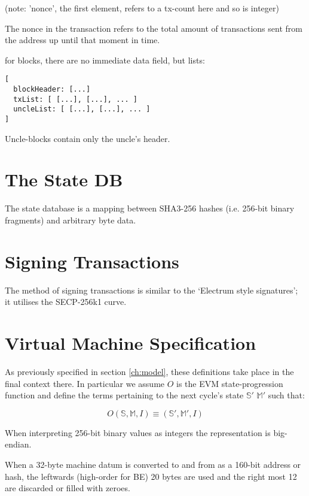 \documentclass[9pt,oneside]{amsart}
\begin{document}
(note: 'nonce', the first element, refers to a tx-count here and so is integer)

The nonce in the transaction refers to the total amount of transactions sent from the address up until that moment in time.

for blocks, there are no immediate data field, but lists:

\begin{verbatim}
[
  blockHeader: [...]
  txList: [ [...], [...], ... ]
  uncleList: [ [...], [...], ... ]
]
\end{verbatim}

Uncle-blocks contain only the uncle's header.

\section{The State DB}\label{app:state}

The state database is a mapping between SHA3-256 hashes (i.e. 256-bit binary fragments) and arbitrary byte data.

\section{Signing Transactions}\label{app:signing}

The method of signing transactions is similar to the `Electrum style signatures'; it utilises the SECP-256k1 curve.

\section{Virtual Machine Specification}\label{app:vm}

As previously specified in section \ref{ch:model}, these definitions take place in the final context there. In particular we assume $O$ is the EVM state-progression function and define the terms pertaining to the next cycle's state $\mathbb{S}'$ $\mathbb{M}'$ such that:

\begin{equation}
O(\mathbb{S}, \mathbb{M}, I) \equiv (\mathbb{S}', \mathbb{M}', I)
\end{equation}

When interpreting 256-bit binary values as integers the representation is big-endian.

When a 32-byte machine datum is converted to and from as a 160-bit address or hash, the leftwards (high-order for BE) 20 bytes are used and the right most 12 are discarded or filled with zeroes.
\end{document}
